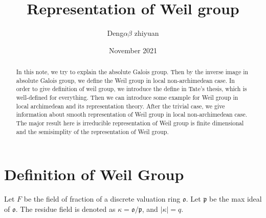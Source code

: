 \documentclass[12pt,a4paper,english]{article}
\title{Representation of Weil group}
\date{November  2021}
\author{Deng$\alpha\beta$ zhiyuan}
\theoremstyle{definition}
\theoremstyle{plain}
\begin{document}
\maketitle

\vspace{0.5cm}

\begin{abstract}
    In this note, we try to explain the absolute Galois group. Then by the inverse image in absolute Galois group, we define the Weil group in local non-archimedean case. In order to give definition of weil group, we introduce the define in Tate's thesis, which is well-defined for everything. Then we can introduce some example for Weil group in local archimedean and its representation theory. After the trivial case, we give information about smooth representation of Weil group in local non-archimedean case. The major result here is irreducible representation of Weil group is finite dimensional and the semisimplity of the representation of Weil group.
\end{abstract}
\section{Definition of Weil Group}
Let $F$ be the field of fraction of a discrete valuation ring $\mathfrak{o}$. Let $\mathfrak{p}$ be the max ideal of $\mathfrak{o}$. The residue field is denoted as $\kappa= \mathfrak{o}/\mathfrak{p}$, and $|\kappa|=q$.
\end{document}
